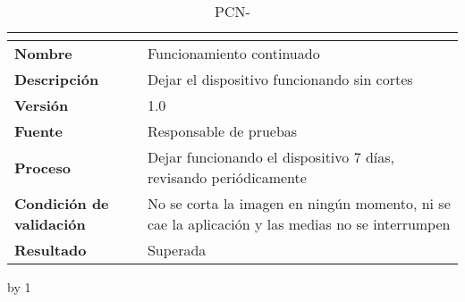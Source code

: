 \begin{table}[H]
	\caption{PCN-\number\pcn}
	\begin{tabular}{|l|p{}|}
		\hline
		\multicolumn{2}{|c|}{\cellcolor[HTML]{BFBFBF}{\color[HTML]{000000} \textbf{PCN-\number\pcn}}} \\ \hline
		\textbf{Nombre}                  & Funcionamiento continuado                                                                       \\ \hline
		\textbf{Descripción}             & Dejar el dispositivo funcionando sin cortes                                                     \\ \hline
		\textbf{Versión}                 & 1.0                                                                                             \\ \hline
		\textbf{Fuente}                  & Responsable de pruebas                                                                          \\ \hline
		\textbf{Proceso}                 & Dejar funcionando el dispositivo 7 días, revisando periódicamente                               \\ \hline
		\textbf{Condición de validación} & No se corta la imagen en ningún momento, ni se cae la aplicación y las medias no se interrumpen \\ \hline
		\textbf{Resultado}               & Superada                                                                                        \\ \hline
	\end{tabular}
\end{table}
\advance\pcn by 1
